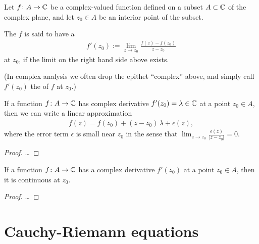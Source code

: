\begin{definition}
  \label{def:complex_derivative}
  Let $f \colon A \to \mathbb{C}$ be a complex-valued function defined on
  a subset $A \subset \mathbb{C}$ of the complex plane, and let $z_0 \in A$
  be an interior point of the subset.

  The $f$ is said to have
  a 
  \begin{align*}
    f'(z_0) := \lim_{z \to z_0} \frac{f(z) - f(z_0)}{z - z_0}
  \end{align*}
  at $z_0$, if the limit on the right hand side above exists.

  (In complex analysis we often drop the epithet ``complex'' above,
  and simply call $f'(z_0)$ the  of $f$ at $z_0$.)
\end{definition}

\begin{lemma}
  \label{lem:local_linear_approximation}
  If a function $f \colon A \to \mathbb{C}$ has complex derivative
  $f'(z_0) = \lambda \in \mathbb{C}$ at a point $z_0 \in A$, then
  we can write a linear approximation
  \begin{align*}
    f(z) = f(z_0) + (z - z_0) \, \lambda + \epsilon(z) ,
  \end{align*}
  where the error term $\epsilon$ is small near $z_0$ in the sense that
  $\lim_{z \to z_0} \frac{\epsilon(z)}{|z-z_0|} = 0$.
\end{lemma}
\begin{proof}
  \ldots
\end{proof}

\begin{lemma}
  \label{lem:complex_derivative_implies_continuous}
  If a function $f \colon A \to \mathbb{C}$ has a complex derivative $f'(z_0)$
  at a point $z_0 \in A$, then it is continuous at $z_0$.
\end{lemma}
\begin{proof}
  \ldots
\end{proof}



\section{Cauchy-Riemann equations}

